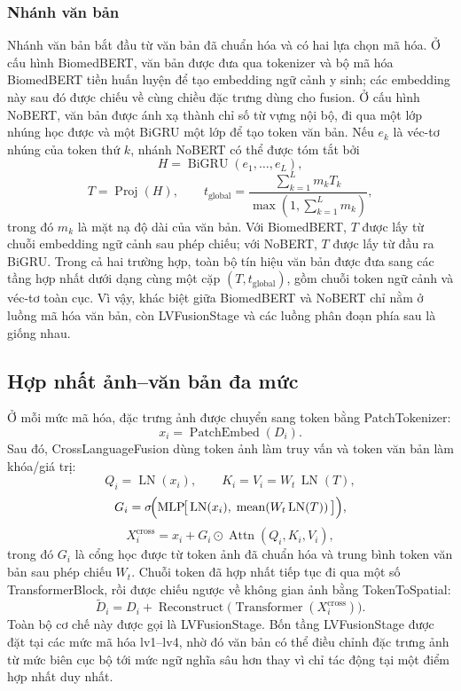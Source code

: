 \subsubsection{Nhánh văn bản}

Nhánh văn bản bắt đầu từ văn bản đã chuẩn hóa và có hai lựa chọn mã hóa. Ở cấu hình BiomedBERT, văn bản được đưa qua tokenizer và bộ mã hóa BiomedBERT tiền huấn luyện để tạo embedding ngữ cảnh y sinh; các embedding này sau đó được chiếu về cùng chiều đặc trưng dùng cho fusion. Ở cấu hình NoBERT, văn bản được ánh xạ thành chỉ số từ vựng nội bộ, đi qua một lớp nhúng học được và một BiGRU một lớp để tạo token văn bản. Nếu \(e_k\) là véc-tơ nhúng của token thứ \(k\), nhánh NoBERT có thể được tóm tắt bởi
\[
H = \operatorname{BiGRU}(e_1,\dots,e_L),
\]
\[
T = \operatorname{Proj}(H),
\qquad
t_{\mathrm{global}} = \frac{\sum_{k=1}^{L} m_k T_k}{\max\!\left(1,\sum_{k=1}^{L} m_k\right)},
\]
trong đó \(m_k\) là mặt nạ độ dài của văn bản. Với BiomedBERT, \(T\) được lấy từ chuỗi embedding ngữ cảnh sau phép chiếu; với NoBERT, \(T\) được lấy từ đầu ra BiGRU. Trong cả hai trường hợp, toàn bộ tín hiệu văn bản được đưa sang các tầng hợp nhất dưới dạng cùng một cặp \((T, t_{\mathrm{global}})\), gồm chuỗi token ngữ cảnh và véc-tơ toàn cục. Vì vậy, khác biệt giữa BiomedBERT và NoBERT chỉ nằm ở luồng mã hóa văn bản, còn LVFusionStage và các luồng phân đoạn phía sau là giống nhau.

\subsection{Hợp nhất ảnh--văn bản đa mức}

Ở mỗi mức mã hóa, đặc trưng ảnh được chuyển sang token bằng PatchTokenizer:
\[
x_i = \operatorname{PatchEmbed}(D_i).
\]
\noindent Sau đó, CrossLanguageFusion dùng token ảnh làm truy vấn và token văn bản làm khóa/giá trị:
\[
Q_i = \operatorname{LN}(x_i), \qquad
K_i = V_i = W_t\,\operatorname{LN}(T),
\]
\[
G_i = \sigma\!\Bigl(\operatorname{MLP}\!\bigl[\,\operatorname{LN}(x_i),\;
\operatorname{mean}(W_t\operatorname{LN}(T))\,\bigr]\Bigr),
\]
\[
X_i^{\text{cross}} = x_i + G_i \odot \operatorname{Attn}(Q_i,K_i,V_i),
\]
trong đó \(G_i\) là cổng học được từ token ảnh đã chuẩn hóa và trung bình token văn bản sau phép chiếu \(W_t\). Chuỗi token đã hợp nhất tiếp tục đi qua một số TransformerBlock, rồi được chiếu ngược về không gian ảnh bằng TokenToSpatial:
\[
\widetilde{D}_i = D_i + \operatorname{Reconstruct}\!\bigl(\operatorname{Transformer}(X_i^{\text{cross}})\bigr).
\]
Toàn bộ cơ chế này được gọi là LVFusionStage. Bốn tầng LVFusionStage được đặt tại các mức mã hóa lv1--lv4, nhờ đó văn bản có thể điều chỉnh đặc trưng ảnh từ mức biên cục bộ tới mức ngữ nghĩa sâu hơn thay vì chỉ tác động tại một điểm hợp nhất duy nhất.


